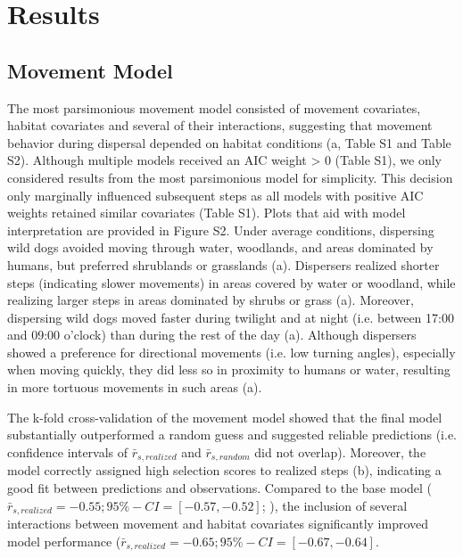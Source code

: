 \documentclass[abstract=on,10pt,a4paper,bibliography=totocnumbered]{article}
\begin{document}
\section{Results}
\subsection{Movement Model}
The most parsimonious movement model consisted of movement covariates, habitat
covariates and several of their interactions, suggesting that movement behavior
during dispersal depended on habitat conditions (a, Table S1
and Table S2). Although multiple models received an AIC weight > 0 (Table S1),
we only considered results from the most parsimonious model for simplicity. This
decision only marginally influenced subsequent steps as all models with positive
AIC weights retained similar covariates (Table S1). Plots that aid with model
interpretation are provided in Figure S2. Under average conditions, dispersing
wild dogs avoided moving through water, woodlands, and areas dominated by
humans, but preferred shrublands or grasslands (a).
Dispersers realized shorter steps (indicating slower movements) in areas covered
by water or woodland, while realizing larger steps in areas dominated by shrubs
or grass (a). Moreover, dispersing wild dogs moved faster
during twilight and at night (i.e. between 17:00 and 09:00 o'clock) than during
the rest of the day (a). Although dispersers showed a
preference for directional movements (i.e. low turning angles), especially when
moving quickly, they did less so in proximity to humans or water, resulting in
more tortuous movements in such areas (a).

The k-fold cross-validation of the movement model showed that the final model
substantially outperformed a random guess and suggested reliable predictions
(i.e. confidence intervals of \(\bar{r}_{s, realized}\) and \(\bar{r}_{s,
random}\) did not overlap). Moreover, the model correctly assigned high
selection scores to realized steps (b), indicating a good
fit between predictions and observations. Compared to the base model
(\(\bar{r}_{s, realized} = -0.55; 95\%-CI = [-0.57, -0.52]\);
\citealp{Hofmann.2021}), the inclusion of several interactions between movement
and habitat covariates significantly improved model performance (\(\bar{r}_{s,
realized} = -0.65; 95\%-CI = [-0.67, -0.64]\).
\end{document}
